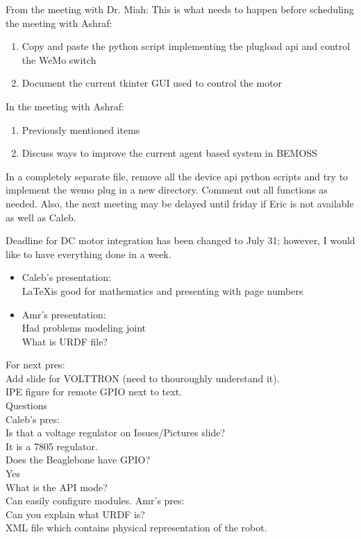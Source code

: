 \documentclass[fontsize=11pt, %
                             paper=letter, %
                             twoside, %
                             captions=tableheading,
                             index=totoc,
                             hyperref]{labbook}
\begin{document}
\begin{addmargin}[0cm]{0cm}
From the meeting with Dr. Miah:
This is what needs to happen before scheduling the meeting with Ashraf: 
\begin{enumerate}
\item Copy and paste the python script implementing the plugload api and control the WeMo switch
\item Document the current tkinter GUI used to control the motor
\end{enumerate}
In the meeting with Ashraf:
\begin{enumerate}
\item Previously mentioned items
\item Discuss ways to improve the current agent based system in BEMOSS
\end{enumerate}

In a completely separate file, remove all the device api python scripts and try to implement the wemo plug in a new directory. Comment out all functions as needed. Also, the next meeting may be delayed until friday if Eric is not available as well as Caleb. 

Deadline for DC motor integration has been changed to July 31; however, I would like to have everything done in a week.
\begin{itemize}
\item
Caleb's presentation:\\
\LaTeX is good for mathematics and presenting with page numbers
\item
Amr's presentation:\\
Had problems modeling joint\\
What is URDF file?\\
\end{itemize}

For next pres:\\
Add slide for VOLTTRON (need to thouroughly understand it).\\
IPE figure for remote GPIO next to text.\\

Questions\\
Caleb's pres:\\
Is that a voltage regulator on Issues/Pictures slide?\\
It is a 7805 regulator.\\
Does the Beaglebone have GPIO?\\
Yes\\
What is the API mode?\\
Can easily configure modules.
\bigbreak\noindent
Amr's pres:\\
Can you explain what URDF is?\\
XML file which contains physical representation of the robot.


\end{addmargin}
\end{document}
